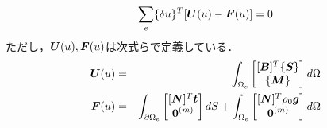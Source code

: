 \begin{equation}\label{eq:SimplyPotentialWeak}
	\sum_{e} \{ \delta u \}^T[{\mbox{\boldmath $U$}}(u)-{\mbox{\boldmath $F$}}(u) ]=0
\end{equation}
ただし，$ {\mbox{\boldmath $U$}}(u), {\mbox{\boldmath $F$}}(u) $は次式らで定義している．
\begin{eqnarray}
	 {\mbox{\boldmath $U$}}(u) &=& \int_{\Omega_e} \left[ \begin{matrix}
	 [{\mbox{\boldmath $B$}}]^T \{{\mbox{\boldmath $S$}} \} \\ \{ {\mbox{\boldmath $M$}} \}
	 \end{matrix}\right] d\Omega \\
	 {\mbox{\boldmath $F$}}(u) &=& \int_{\partial \Omega_e} \left[ \begin{matrix}
	 [{\mbox{\boldmath $N$}}]^T {\mbox{\boldmath $t$}} \\ {\mbox{\boldmath $0$}}^{(m)}
	 \end{matrix}\right] dS + \int_{\Omega_e}
	\left[ \begin{matrix}
	[{\mbox{\boldmath $N$}}]^T \rho_0 {\mbox{\boldmath $g$}} \\ {\mbox{\boldmath $0$}}^{(m)}
	\end{matrix}\right]	 d\Omega
\end{eqnarray}